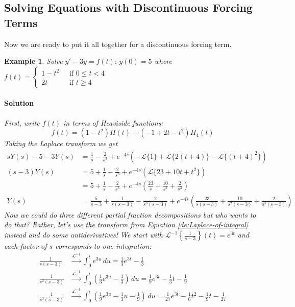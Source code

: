 \documentclass[letterpaper, 11pt, openany]{book}
\theoremstyle{mytheoremstyle}
\theoremstyle{myexamplestyle}
\newtheorem{example}{Example}[section]
\newenvironment{solution}{\paragraph{\sffamily \smaller \fontseries{b}\selectfont Solution}}{\hfill\faSquare}
\begin{document}
\subsection{Solving Equations with Discontinuous Forcing Terms}

Now we are ready to put it all together for a discontinuous forcing term.

\begin{example}
    Solve \(y' - 3y = f(t); \, y(0) = 5\) where \(f(t) = \begin{cases}
        1-t^2\; &\text{ if } 0 \leq t < 4\\
        2t\; &\text{ if } t \geq 4
    \end{cases}\)
    \begin{solution}
        First, write \(f(t)\) in terms of Heaviside functions:
        \[f(t) = (1-t^2)H(t) + (-1 + 2t - t^2)H_{4}(t)\]
        Taking the Laplace transform we get
        \begin{align*}
            sY(s) - 5 - 3Y(s)   &= \frac{1}{s} - \frac{2}{s^{3}} + e^{-4s}\left(-\mathcal{L}\{1\} + \mathcal{L}\{2(t+4)\} - \mathcal{L}\{(t+4)^2\}\right)\\
            (s-3)Y(s)           &= 5+ \frac{1}{s} - \frac{2}{s^{3}} + e^{-4s}\left(\mathcal{L}\{23 + 10t + t^2\}\right)\\
                                &= 5+ \frac{1}{s} - \frac{2}{s^{3}} + e^{-4s}\left(\frac{23}{s} + \frac{10}{s^{2}} + \frac{2}{s^{3}}\right)\\
            Y(s)                &= \frac{5}{s-3} + \frac{1}{s(s-3)} - \frac{2}{s^{3}(s-3)} + e^{-4s}\left(\frac{23}{s(s-3)} + \frac{10}{s^{2}(s-3)} + \frac{2}{s^{3}(s-3)}\right)
        \end{align*}
        Now we could do three different partial fraction decompositions but who wants to do that? Rather, let's use the transform from Equation \ref{de:Laplace-of-integral} instead and do some antiderivatives! We start with \(\mathcal{L}^{-1}\left\{\frac{1}{s-3}\right\}(t) = e^{3t}\) and each factor of \(s\) corresponds to one integration:
        \begin{align*}
            \frac{1}{s(s-3)} &\xrightarrow{\mathcal{L}^{-1}} \int_{0}^{t} e^{3u} \, du = \frac{1}{3}e^{3t} - \frac{1}{3}\\
            \frac{1}{s^2 (s-3)} &\xrightarrow{\mathcal{L}^{-1}} \int_{0}^{t} \left(\frac{1}{3}e^{3u} - \frac{1}{3}\right)\, du = \frac{1}{9}e^{3t} - \frac{1}{3}t - \frac{1}{9}\\
            \frac{1}{s^3 (s-3)} &\xrightarrow{\mathcal{L}^{-1}} \int_{0}^{t} \left(\frac{1}{9}e^{3u} - \frac{1}{3}u - \frac{1}{9}\right)\, du = \frac{1}{27}e^{3t} - \frac{1}{6}t^{2} - \frac{1}{9}t - \frac{1}{27}

\end{align*}
\end{solution}
\end{example}
\end{document}
